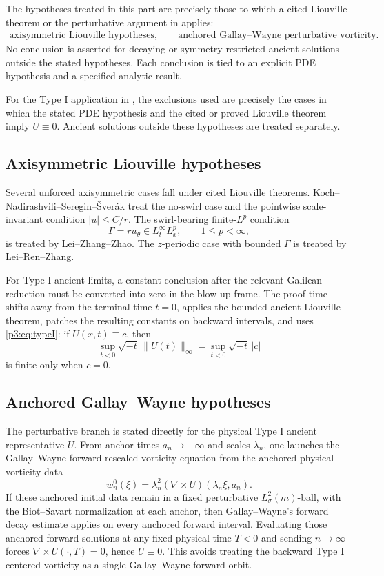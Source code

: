 \documentclass[11pt]{amsart}
\theoremstyle{plain}
\theoremstyle{definition}
\theoremstyle{remark}
\numberwithin{equation}{section}
\begin{document}
The hypotheses treated in this part are precisely those to which a cited
Liouville theorem or the perturbative argument in
 applies:
\[
   \begin{gathered}
   \text{axisymmetric Liouville hypotheses},\qquad
   \text{anchored Gallay--Wayne perturbative vorticity}.
   \end{gathered}
\]
No conclusion is asserted for decaying or symmetry-restricted ancient solutions
outside the stated hypotheses.  Each conclusion is tied to an explicit
PDE hypothesis and a specified analytic result.

For the Type I application in , the exclusions used are
precisely the cases in which the stated PDE hypothesis and the cited or proved
Liouville theorem imply \(U\equiv0\).  Ancient solutions outside these
hypotheses are treated separately.

\subsection{Axisymmetric Liouville hypotheses}

Several unforced axisymmetric cases fall under cited Liouville theorems.
Koch--Nadirashvili--Seregin--\v{S}ver\'ak treat the no-swirl case
and the pointwise scale-invariant condition \(|u|\le C/r\).  The
swirl-bearing finite-\(L^p\) condition
\[
   \Gamma=ru_\theta\in L_t^\infty L_x^p,\qquad 1\le p<\infty,
\]
is treated by Lei--Zhang--Zhao.  The \(z\)-periodic case with bounded
\(\Gamma\) is treated by Lei--Ren--Zhang.

For Type I ancient limits, a constant conclusion after the relevant Galilean
reduction must be converted into zero in the blow-up frame.  The proof
time-shifts away from the terminal time \(t=0\), applies the bounded ancient
Liouville theorem, patches the resulting constants on backward intervals, and
uses
\eqref{p3:eq:typeI}: if \(U(x,t)\equiv c\), then
\[
   \sup_{t<0}\sqrt{-t}\,\|U(t)\|_\infty
   =
   \sup_{t<0}\sqrt{-t}\,|c|
\]
is finite only when \(c=0\).

\subsection{Anchored Gallay--Wayne hypotheses}

The perturbative branch is stated directly for the physical Type I ancient
representative \(U\).  From anchor times \(a_n\to-\infty\) and scales
\(\lambda_n\), one launches the Gallay--Wayne forward rescaled vorticity
equation from the anchored physical vorticity data
\[
   w_n^0(\xi)=\lambda_n^2(\nabla\times U)(\lambda_n\xi,a_n).
\]
If these anchored initial data remain in a fixed perturbative
\(L^2_\sigma(m)\)-ball, with the Biot--Savart normalization at each anchor,
then Gallay--Wayne's forward decay estimate applies on every anchored forward
interval.  Evaluating those anchored forward solutions at any fixed physical
time \(T<0\) and sending \(n\to\infty\) forces \(\nabla\times U(\cdot,T)=0\),
hence \(U\equiv0\).  This avoids treating the backward Type I centered
vorticity as a single Gallay--Wayne forward orbit.
\end{document}
